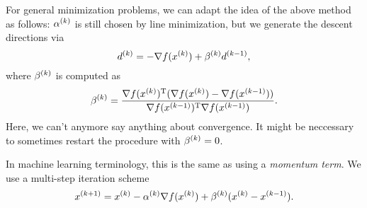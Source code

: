 \documentclass{article}
\begin{document}
\label{s:conjugate-gradient-nonlinear}

For general minimization problems, we can adapt the idea of the above method as follows:
\(\kth{\alpha}\) is still chosen by line minimization, but we generate the descent directions via
\begin{equation*}
  \kth{d} = -\nabla f(\kth{x}) + \kth{\beta}\kth[k-1]{d},
\end{equation*}
where \(\kth{\beta}\) is computed as
\begin{equation*}
  \kth{\beta} = \frac{\T{\nabla f(\kth{x})}(\nabla f(\kth{x}) - \nabla f(\kth[k-1]{x}))}{
    \T{\nabla f(\kth[k-1]{x})} \nabla f(\kth[k-1]{x})}.
\end{equation*}
Here, we can't anymore say anything about convergence.  It might be neccessary to sometimes restart
the procedure with \(\kth{\beta} = 0\).


\label{s:heavy-ball-method}

In machine learning terminology, this is the same as using a \emph{momentum term}.  We use a
multi-step iteration scheme
\begin{equation*}
  \kth[k+1]{x} = \kth{x} - \kth{\alpha} \nabla f(\kth{x}) + \kth{\beta}(\kth{x} - \kth[k-1]{x}).
\end{equation*}
\end{document}
